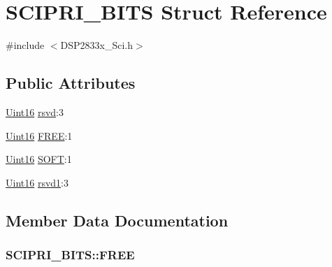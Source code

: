 \hypertarget{struct_s_c_i_p_r_i___b_i_t_s}{}\section{S\+C\+I\+P\+R\+I\+\_\+\+B\+I\+T\+S Struct Reference}
\label{struct_s_c_i_p_r_i___b_i_t_s}


{\ttfamily \#include $<$D\+S\+P2833x\+\_\+\+Sci.\+h$>$}

\subsection*{Public Attributes}
\begin{DoxyCompactItemize}
\item 
\hyperlink{_d_s_p2833x___device_8h_a59a9f6be4562c327cbfb4f7e8e18f08b}{Uint16} \hyperlink{struct_s_c_i_p_r_i___b_i_t_s_a9f2d1bf2eb826466f5d7cb54363ec80b}{rsvd}\+:3
\item 
\hyperlink{_d_s_p2833x___device_8h_a59a9f6be4562c327cbfb4f7e8e18f08b}{Uint16} \hyperlink{struct_s_c_i_p_r_i___b_i_t_s_ac5e342523375f1fc1086a9bd7f61ad48}{F\+R\+E\+E}\+:1
\item 
\hyperlink{_d_s_p2833x___device_8h_a59a9f6be4562c327cbfb4f7e8e18f08b}{Uint16} \hyperlink{struct_s_c_i_p_r_i___b_i_t_s_a5c1ce51b9351b53aaad1820b05bfac78}{S\+O\+F\+T}\+:1
\item 
\hyperlink{_d_s_p2833x___device_8h_a59a9f6be4562c327cbfb4f7e8e18f08b}{Uint16} \hyperlink{struct_s_c_i_p_r_i___b_i_t_s_a935e596af893352ddad6dfaa86edc37c}{rsvd1}\+:3
\end{DoxyCompactItemize}


\subsection{Member Data Documentation}
\hypertarget{struct_s_c_i_p_r_i___b_i_t_s_ac5e342523375f1fc1086a9bd7f61ad48}{}
\subsubsection[{F\+R\+E\+E}]{ S\+C\+I\+P\+R\+I\+\_\+\+B\+I\+T\+S\+::\+F\+R\+E\+E}\label{struct_s_c_i_p_r_i___b_i_t_s_ac5e342523375f1fc1086a9bd7f61ad48}
\hypertarget{struct_s_c_i_p_r_i___b_i_t_s_a9f2d1bf2eb826466f5d7cb54363ec80b}{}
